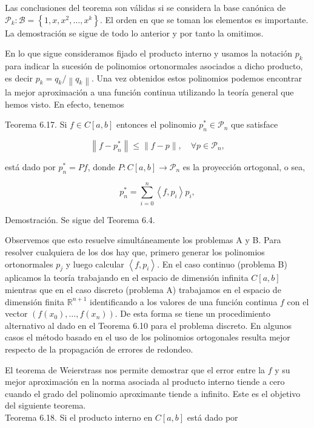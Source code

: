 \documentclass[10pt]{article}
\begin{document}
Las conclusiones del teorema son válidas si se considera la base canónica de $\mathcal{P}_{k}: \mathcal{B}=\left\{1, x, x^{2}, \ldots, x^{k}\right\}$. El orden en que se toman los elementos es importante. La demostración se sigue de todo lo anterior y por tanto la omitimos.

En lo que sigue consideramos fijado el producto interno y usamos la notación $p_{k}$ para indicar la sucesión de polinomios ortonormales asociados a dicho producto, es decir $p_{k}=q_{k} /\left\|q_{k}\right\|$. Una vez obtenidos estos polinomios podemos encontrar la mejor aproximación a una función continua utilizando la teoría general que hemos visto. En efecto, tenemos

Teorema 6.17. Si $f \in C[a, b]$ entonces el polinomio $p_{n}^{*} \in \mathcal{P}_{n}$ que satisface

$$
\left\|f-p_{n}^{*}\right\| \leq\|f-p\|, \quad \forall p \in \mathcal{P}_{n},
$$

está dado por $p_{n}^{*}=P f$, donde $P: C[a, b] \longrightarrow \mathcal{P}_{n}$ es la proyección ortogonal, o sea,

$$
p_{n}^{*}=\sum_{i=0}^{n}\left\langle f, p_{i}\right\rangle p_{i},
$$

Demostración. Se sigue del Teorema 6.4.

Observemos que esto resuelve simultáneamente los problemas A y B. Para resolver cualquiera de los dos hay que, primero generar los polinomios ortonormales $p_{j}$ y luego calcular $\left\langle f, p_{i}\right\rangle$. En el caso continuo (problema B) aplicamos la teoría trabajando en el espacio de dimensión infinita $C[a, b]$ mientras que en el caso discreto (problema A) trabajamos en el espacio de dimensión finita $\mathbb{R}^{n+1}$ identificando a los valores de una función continua $f$ con el vector $\left(f\left(x_{0}\right), \ldots, f\left(x_{n}\right)\right)$. De esta forma se tiene un procedimiento alternativo al dado en el Teorema 6.10 para el problema discreto. En algunos casos el método basado en el uso de los polinomios ortogonales resulta mejor respecto de la propagación de errores de redondeo.

El teorema de Weierstrass nos permite demostrar que el error entre la $f$ y su mejor aproximación en la norma asociada al producto interno tiende a cero cuando el grado del polinomio aproximante tiende a infinito. Este es el objetivo del siguiente teorema.\\
Teorema 6.18. Si el producto interno en $C[a, b]$ está dado por
\end{document}

